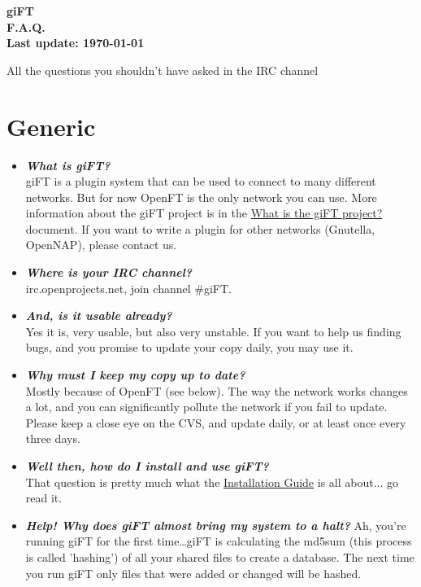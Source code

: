 \documentclass[10pt]{article}
\newcommand{\question}[1]{\item\textbf{\emph{#1}}}
\begin{document}
\begin{center}
\textsf{\textbf{\Huge{giFT} \\ \huge{F.A.Q.} \\
\normalsize{Last update: \today}}}
\end{center}

\begin{center}
All the questions you shouldn't have asked in the IRC channel
\end{center}

\tableofcontents

\setlength{\parskip}{1.4ex}

\section{Generic}
\begin{itemize}

\question {What is giFT?}\\
giFT is a plugin system that can be used to connect to many
different networks.  But for now OpenFT is the only network you
can use. More information about the giFT project is in the
\href{http://gift.sourceforge.net/docs/?document=whatis.html}{What
is the giFT project?} document. If you want to write a plugin for
other networks (Gnutella, OpenNAP), please contact us.  

\question {Where is your IRC channel?}\\
irc.openprojects.net, join channel \#giFT. 

\question {And, is it usable already?}\\
Yes it is, very usable, but also very unstable. If you want to
help us finding bugs, and you promise to update your copy daily,
you may use it.

\question {Why must I keep my copy up to date?}\\
Mostly because of OpenFT (see below). The way the network works
changes a lot, and you can significantly pollute the network if
you fail to update. Please keep a close eye on the CVS, and update
daily, or at least once every three days. 

\question {Well then, how do I install and use giFT?}\\
That question is pretty much what the
\href{http://gift.sourceforge.net/docs/?document=install.html}{Installation
Guide} is all about... go read it.

\question {Help! Why does giFT almost bring my system to a halt?}
Ah, you're running giFT for the first time\ldots  giFT is
calculating the md5sum (this process is called 'hashing') of all
your shared files to create a database. The next time you run giFT
only files that were added or changed will be hashed.


\end{itemize}
\end{document}
